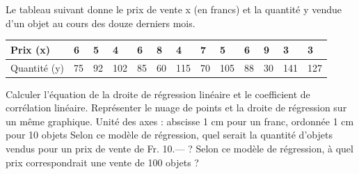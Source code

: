 \begin{exercice}
Le tableau suivant donne le prix de vente x (en francs) et la quantité y vendue d'un objet au cours des douze derniers mois.

\begin{tabular}{|l|l|l|l|l|l|l|l|l|l|l|l|l|}
\hline
Prix (x)     & 6  & 5  & 4   & 6  & 8  & 4   & 7  & 5   & 6  & 9  & 3   & 3   \\ \hline
Quantité (y) & 75 & 92 & 102 & 85 & 60 & 115 & 70 & 105 & 88 & 30 & 141 & 127 \\ \hline
\end{tabular}


Calculer l'équation de la droite de régression linéaire et le coefficient de corrélation linéaire.
Représenter le nuage de points et la droite de régression sur un même graphique. 
Unité des axes : abscisse 1 cm pour un franc, ordonnée 1 cm pour 10 objets
Selon ce modèle de régression, quel serait la quantité d'objets vendus pour un prix de vente de Fr. 10.— ?
Selon ce modèle de régression, à quel prix correspondrait une vente de 100 objets ?
\end{exercice}